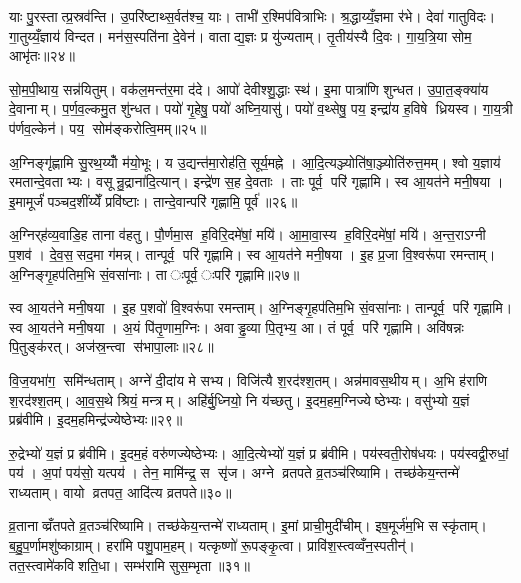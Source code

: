 याः पु॒रस्तात्प्र॒स्रव॑न्ति। उ॒परि॑ष्टाथ्स॒र्वत॑श्च॒ याः। ताभी॑ र॒श्मिप॑वित्राभिः। श्र॒द्धाय्यँ॒ज्ञमा र॑भे। देवा॑ गातुविदः। गा॒तुय्यँ॒ज्ञाय॑ विन्दत। मन॑स॒स्पति॑ना दे॒वेन॑। वाताद्य॒ज्ञः प्र यु॑ज्यताम्। तृ॒तीय॑स्यै दि॒वः। गा॒य॒त्रि॒या सोम॒ आभृ॑तः॥२४॥

सो॒म॒पी॒थाय॒ सन्न॑यितुम्। वक॑ल॒मन्त॑र॒मा द॑दे। आपो॑ देवीश्शु॒द्धाः स्थ॑। इ॒मा पात्रा॑णि शुन्धत। उ॒पा॒त॒ङ्क्या॑य दे॒वानाम्। प॒र्ण॒व॒ल्कमु॒त शु॑न्धत। पयो॑ गृ॒हेषु॒ पयो॑ अघ्नि॒यासु॑। पयो॑ व॒थ्सेषु॒ पय॒ इन्द्रा॑य ह॒विषे ध्रियस्व। गा॒य॒त्री प॑र्णव॒ल्केन॑। पय॒ सोम॑ङ्करोत्वि॒मम्॥२५॥

अ॒ग्निङ्गृ॑ह्णामि सु॒रथ॒य्योँ म॑यो॒भूः। य उ॒द्यन्त॑मा॒रोह॑ति॒ सूर्य॒मह्ने। आ॒दि॒त्यञ्ज्योति॑षा॒ञ्ज्योति॑रुत्त॒मम्। श्वो य॒ज्ञाय॑ रमतान्दे॒वताभ्यः। वसून्रु॒द्राना॑दि॒त्यान्। इन्द्रे॑ण स॒ह दे॒वताः। ताः पूर्व॒ परि॑ गृह्णामि। स्व आ॒यत॑ने मनी॒षया। इ॒मामूर्जं॑ पञ्चद॒शींय्येँ प्रवि॑ष्टाः। तान्दे॒वान्परि॑ गृह्णामि॒ पूर्व॑॥२६॥

अ॒ग्निर्‌ह॑व्य॒वाडि॒ह ताना व॑हतु। पौ॒र्णमा॒स ह॒विरि॒दमे॑षां॒ मयि॑। आ॒मा॒वा॒स्य ह॒विरि॒दमे॑षां॒ मयि॑। अ॒न्त॒राऽग्नी प॒शव॑। दे॒व॒स॒सद॒मा ग॑मन्न्। तान्पूर्व॒ परि॑ गृह्णामि। स्व आ॒यत॑ने मनी॒षया। इ॒ह प्र॒जा वि॒श्वरू॑पा रमन्ताम्। अ॒ग्निङ्गृ॒हप॑तिम॒भि सं॒वसा॑नाः। ता ःपूर्व॒ ःपरि॑ गृह्णामि॥२७॥

स्व आ॒यत॑ने मनी॒षया। इ॒ह प॒शवो॑ वि॒श्वरू॑पा रमन्ताम्। अ॒ग्निङ्गृ॒हप॑तिम॒भि सं॒वसा॑नाः। तान्पूर्व॒ परि॑ गृह्णामि। स्व आ॒यत॑ने मनी॒षया। अ॒यं पि॑तृ॒णाम॒ग्निः। अवाड्ढ॒व्या पि॒तृभ्य॒ आ। तं पूर्व॒ परि॑ गृह्णामि। अवि॑षन्नः पि॒तुङ्क॑रत्। अज॑स्र॒न्त्वा स॑भापा॒लाः॥२८॥

वि॒ज॒यभा॑ग॒ समि॑न्धताम्। अग्ने॑ दी॒दा॑य मे सभ्य। विजि॑त्यै श॒रद॑श्श॒तम्। अन्न॑मावस॒थीयम्। अ॒भि ह॑राणि श॒रद॑श्श॒तम्। आ॒व॒स॒थे श्रियं॒ मन्त्रम्। अहि॑र्बु॒ध्नियो॒ नि य॑च्छतु। इ॒दम॒हम॒ग्निज्येष्ठेभ्यः। वसु॑भ्यो य॒ज्ञं प्रब्र॑वीमि। इ॒दम॒हमिन्द्र॑ज्येष्ठेभ्यः॥२९॥

रु॒द्रेभ्यो॑ य॒ज्ञं प्र ब्र॑वीमि। इ॒दम॒हं वरु॑णज्येष्ठेभ्यः। आ॒दि॒त्येभ्यो॑ य॒ज्ञं प्र ब्र॑वीमि। पय॑स्वती॒रोष॑धयः। पय॑स्वद्वी॒रुधां॒ पय॑। अ॒पां पय॑सो॒ यत्पय॑। तेन॒ मामि॑न्द्र॒ स सृ॑ज। अग्ने व्रतपते व्र॒तञ्च॑रिष्यामि। तच्छ॑केय॒न्तन्मे॑ राध्यताम्। वायो व्रतपत॒ आदि॑त्य व्रतपते॥३०॥

व्र॒तानाव्व्रँतपते व्र॒तञ्च॑रिष्यामि। तच्छ॑केय॒न्तन्मे॑ राध्यताम्। इ॒मां प्राची॒मुदी॑चीम्। इष॒मूर्ज॑म॒भि सस्कृ॑ताम्। ब॒हु॒प॒र्णामशु॑ष्काग्राम्। हरा॑मि पशु॒पाम॒हम्। यत्कृष्णो॑ रू॒पङ्कृ॒त्वा। प्रावि॑श॒स्त्वव्वँन॒स्पतीन्॑। तत॒स्त्वामे॑कविशति॒धा। सम्भ॑रामि सुस॒म्भृता॥३१॥

